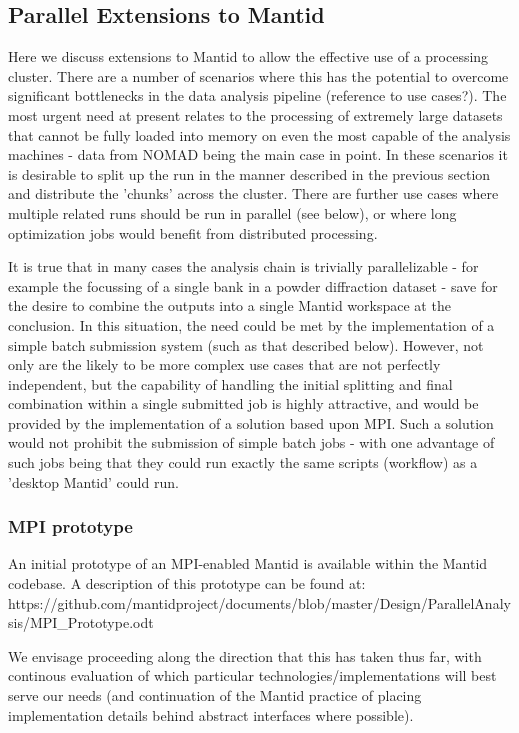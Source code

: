 \subsection{Parallel Extensions to Mantid}
\label{subsec:ParallelExtensions}

Here we discuss extensions to Mantid to allow the effective use of a processing cluster. There are a number of scenarios where this has the potential to overcome significant bottlenecks in the data analysis pipeline (reference to use cases?). The most urgent need at present relates to the processing of extremely large datasets that cannot be fully loaded into memory on even the most capable of the analysis machines - data from NOMAD being the main case in point. In these scenarios it is desirable to split up the run in the manner described in the previous section and distribute the 'chunks' across the cluster. There are further use cases where multiple related runs should be run in parallel (see below), or where long optimization jobs would benefit from distributed processing.

It is true that in many cases the analysis chain is trivially parallelizable - for example the focussing of a single bank in a powder diffraction dataset - save for the desire to combine the outputs into a single Mantid workspace at the conclusion. In this situation, the need could be met by the implementation of a simple batch submission system (such as that described below). However, not only are the likely to be more complex use cases that are not perfectly independent, but the capability of handling the initial splitting and final combination within a single submitted job is highly attractive, and would be provided by the implementation of a solution based upon MPI. 
Such a solution would not prohibit the submission of simple batch jobs - with one advantage of such jobs being that they could run exactly the same scripts (workflow) as a 'desktop Mantid' could run.

\subsubsection{MPI prototype}

An initial prototype of an MPI-enabled Mantid is available within the Mantid codebase. A description of this prototype can be found at: https://github.com/mantidproject/documents/blob/master/Design/ParallelAnalysis/MPI_Prototype.odt

We envisage proceeding along the direction that this has taken thus far, with continous evaluation of which particular technologies/implementations will best serve our needs (and continuation of the Mantid practice of placing implementation details behind abstract interfaces where possible).

